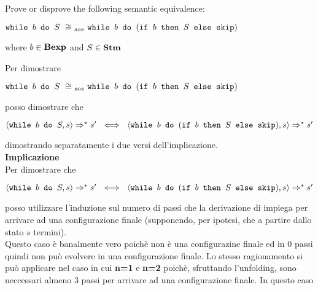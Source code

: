 \newcommand{\exFour}
{$\wbS{b}{S}~\cong{}_{sos}~\wbS{b}{(\ifABC{b}{S}{\skipistr})} $}

\newcommand{\exFourIff}
{$\confSs{\wbS{b}{S}}{s}\Rar{*}s'~\iff{}~\confSs{\wbS{b}
{(\ifABC{b}{S}{\skipistr})}}{s}\Rar{*}s'$}

\newcommand{\exFourLtR}
{$\confSs{\wbS{b}{S}}{s}\Rar{*}s'~\Rar{}~\confSs{\wbS{b}
{(\ifABC{b}{S}{\skipistr})}}{s}\Rar{*}s'$}

{
	Prove or disprove the following semantic equivalence:\\
	\begin{center}
	\exFour{}
	\end{center}
	where $b\in\mbox{\textbf{Bexp}}$ and $S\in\mbox{\textbf{Stm}}$
}
{
	Per dimostrare 
	\begin{center}
	\exFour{}
	\end{center}
	posso dimostrare che 
	\begin{center}
	\exFourIff{}
	\end{center}
	dimostrando separatamente i due versi dell'implicazione. \\
	
	\textbf{Implicazione \Rar{}} \\
	Per dimostrare che 
	\begin{center}
	\exFourIff{}
	\end{center}
	posso utilizzare l'induzione sul numero di passi che la derivazione di 
	 impiega per arrivare ad una configurazione finale 
	(supponendo, per ipotesi, che a partire dallo stato $s$  termini).
	\\
	 Questo caso è banalmente vero poichè 
	 non è una configurazine finale ed in 0 passi quindi
	non può evolvere in una configurazione finale. Lo stesso ragionamento si
	può applicare nel caso in cui \textbf{n=1} e \textbf{n=2} poichè,
	sfruttando l'unfolding, sono neccessari almeno 3 passi per arrivare ad una
	configurazione finale.
	 In questo caso 
}
